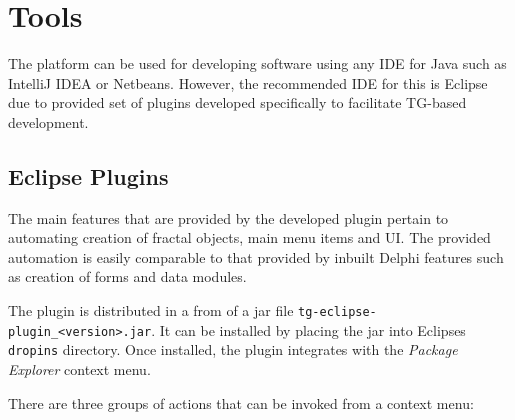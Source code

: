 \chapter{Tools}\label{ch02:00}


  The platform can be used for developing software using any IDE for Java such as IntelliJ IDEA or Netbeans.
  However, the recommended IDE for this is Eclipse due to provided set of plugins developed specifically to facilitate TG-based development.
  
\section{Eclipse Plugins}

  The main features that are provided by the developed plugin pertain to automating creation of fractal objects, main menu items and UI.
  The provided automation is easily comparable to that provided by inbuilt Delphi features such as creation of forms and data modules.
  
  The plugin is distributed in a from of a jar file \texttt{tg-eclipse-plugin\_\textless version\textgreater.jar}.
  It can be installed by placing the jar into Eclipses \texttt{dropins} directory.
  Once installed, the plugin integrates with the \emph{Package Explorer} context menu.
  
  There are three groups of actions that can be invoked from a context menu:
  
